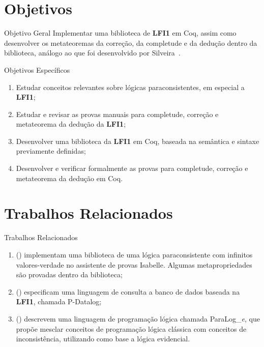 \documentclass[xcolor=table]{beamer}
\newcommand{\lfium}{{\normalfont\textbf{LFI1}}}
\begin{document}
\section[]{Objetivos}
    \begin{frame}{Objetivo Geral}
        Implementar uma biblioteca de \lfium{} em Coq, assim como desenvolver os metateoremas da correção, da completude e da dedução dentro da biblioteca, análogo ao que foi desenvolvido por Silveira~\citeyear{silveira2020implementacao}.
    \end{frame}

    \begin{frame}{Objetivos Específicos}
        \begin{enumerate}
			\item Estudar conceitos relevantes sobre lógicas paraconsistentes, em especial a \lfium{};
            \item Estudar e revisar as provas manuais para completude, correção e metateorema da dedução da \lfium{};
            \item Desenvolver uma biblioteca da \lfium{} em Coq, baseada na semântica e sintaxe previamente definidas;
            \item Desenvolver e verificar formalmente as provas para completude, correção e metateorema da dedução em Coq.
		\end{enumerate}
    \end{frame}

\section[]{Trabalhos Relacionados}
    \begin{frame}{Trabalhos Relacionados}
        \begin{enumerate}
            \item {} (\citeyear{Villadsen2017}) implementam uma biblioteca de uma lógica paraconsistente com infinitos valores-verdade no assistente de provas Isabelle. Algumas metapropriedades são provadas dentro da biblioteca;
            \item {} (\citeyear{pdatalog}) especificam uma linguagem de consulta a banco de dados baseada na \lfium{}, chamada P{-}Datalog;
            \item {} (\citeyear{paralog}) descrevem uma linguagem de programação lógica chamada ParaLog\_\textit{e}, que propõe mesclar conceitos de programação lógica clássica com conceitos de inconsistência, utilizando como base a lógica evidencial.
        \end{enumerate}
    \end{frame}
\end{document}
